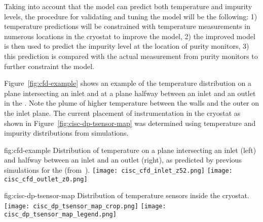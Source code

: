 Taking into account that the  model can predict both temperature and impurity levels, the procedure for validating and tuning the  model will be the following: 1) temperature predictions will be constrained with temperature measurements in numerous locations in the cryostat to improve the  model, 2) the improved model is then used to predict the \lar impurity level at the location of purity monitors, 3) this prediction is compared with the actual measurement from purity monitors to further constraint the  model.  



Figure~\ref{fig:cfd-example} shows an example of the temperature
distribution on a plane intersecting an \lar inlet and at a
plane halfway between an inlet and an outlet in the .
Note the plume of higher temperature \lar between the walls and
the outer  on the inlet plane. The current placement of instrumentation in
the cryostat as shown in Figure~\ref{fig:cisc-dp-tsensor-map} was determined using temperature and impurity distributions from  simulations.

\begin{dunefigure}{fig:cfd-example}
  {Distribution of temperature on a plane intersecting an inlet (left) and halfway between an inlet and an outlet (right), as predicted by previous  simulations for the  (from~\cite{bib:docdb5915}).}
  \texttt{[image: cisc\_cfd\_inlet\_z52.png]}
  \texttt{[image: cisc\_cfd\_outlet\_z0.png]}
\end{dunefigure}

\begin{dunefigure}{fig:cisc-dp-tsensor-map}
  {Distribution of temperature sensors inside the cryostat.}
  \texttt{[image: cisc\_dp\_tsensor\_map\_crop.png]}
  \texttt{[image: cisc\_dp\_tsensor\_map\_legend.png]}
\end{dunefigure}


